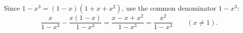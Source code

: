 Since $1-x^3=(1-x)(1+x+x^2)$, use the common denominator $1-x^3$:
\[
\dfrac{x}{1-x^3}-\dfrac{x(1-x)}{1-x^3}=\dfrac{x-x+x^2}{1-x^3}=\boxed{\dfrac{x^2}{1-x^3}}\qquad(x\ne1).
\]

